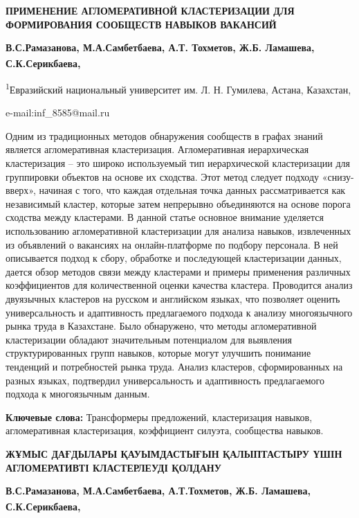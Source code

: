 \begin{articleheader}
{\bfseries ПРИМЕНЕНИЕ АГЛОМЕРАТИВНОЙ КЛАСТЕРИЗАЦИИ ДЛЯ ФОРМИРОВАНИЯ
СООБЩЕСТВ НАВЫКОВ ВАКАНСИЙ}

{\bfseries В.С.Рамазанова, М.А.Самбетбаева, А.Т. Тохметов, Ж.Б. Ламашева,
С.К.Серикбаева\textsuperscript{\envelope },}
\end{articleheader}

\begin{affiliation}
\textsuperscript{1}Евразийский национальный университет им. Л. Н.
Гумилева, Астана, Казахстан,

e-mail:inf\_8585@mail.ru
\end{affiliation}

Одним из традиционных методов обнаружения сообществ в графах знаний
является агломеративная кластеризация. Агломеративная иерархическая
кластеризация -- это широко используемый тип иерархической кластеризации
для группировки объектов на основе их сходства. Этот метод следует
подходу «снизу-вверх», начиная с того, что каждая отдельная точка данных
рассматривается как независимый кластер, которые затем непрерывно
объединяются на основе порога сходства между кластерами. В данной статье
основное внимание уделяется использованию агломеративной кластеризации
для анализа навыков, извлеченных из объявлений о вакансиях на
онлайн-платформе по подбору персонала. В ней описывается подход к сбору,
обработке и последующей кластеризации данных, дается обзор методов связи
между кластерами и примеры применения различных коэффициентов для
количественной оценки качества кластера. Проводится анализ двуязычных
кластеров на русском и английском языках, что позволяет оценить
универсальность и адаптивность предлагаемого подхода к анализу
многоязычного рынка труда в Казахстане. Было обнаружено, что методы
агломеративной кластеризации обладают значительным потенциалом для
выявления структурированных групп навыков, которые могут улучшить
понимание тенденций и потребностей рынка труда. Анализ кластеров,
сформированных на разных языках, подтвердил универсальность и
адаптивность предлагаемого подхода к многоязычным данным.

{\bfseries Ключевые слова:} Трансформеры предложений, кластеризация
навыков, агломеративная кластеризация, коэффициент силуэта, сообщества
навыков.

\begin{articleheader}
{\bfseries ЖҰМЫС ДАҒДЫЛАРЫ ҚАУЫМДАСТЫҒЫН ҚАЛЫПТАСТЫРУ ҮШІН АГЛОМЕРАТИВТІ
КЛАСТЕРЛЕУДІ ҚОЛДАНУ}

{\bfseries В.С.Рамазанова, М.А.Самбетбаева, А.Т.Тохметов, Ж.Б. Ламашева,
С.К.Серикбаева\textsuperscript{\envelope },}
\end{articleheader}

